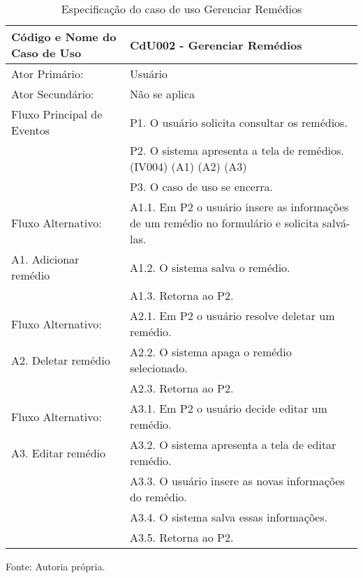 \begin{apendicesenv}
\begin{table}[!h]
	\begin{center}
		\caption{Especificação do caso de uso Gerenciar Remédios}
		\begin{tabular}{ | l |  p{10cm} |}
			\hline
			Código e Nome do Caso de Uso & CdU002 - Gerenciar Remédios \\ \hline
			Ator Primário: & Usuário \\
			Ator Secundário: & Não se aplica \\ \hline
			Fluxo Principal de Eventos & P1. O usuário solicita consultar os remédios. \\
						   & P2. O sistema apresenta a tela de remédios. (IV004) (A1) (A2) (A3) \\
						   & P3. O caso de uso se encerra. \\ \hline
			Fluxo Alternativo:         & A1.1. Em P2 o usuário insere as informações de um remédio no formulário e solicita salvá-las. \\
			A1. Adicionar remédio      & A1.2. O sistema salva o remédio. \\
						   & A1.3. Retorna ao P2. \\ \hline
			Fluxo Alternativo:         & A2.1. Em P2 o usuário resolve deletar um remédio. \\
			A2. Deletar remédio        & A2.2. O sistema apaga o remédio selecionado. \\
						   & A2.3. Retorna ao P2. \\ \hline
			Fluxo Alternativo:         & A3.1. Em P2 o usuário decide editar um remédio. \\
			A3. Editar remédio         & A3.2. O sistema apresenta a tela de editar remédio. \\
						   & A3.3. O usuário insere as novas informações do remédio. \\
						   & A3.4. O sistema salva essas informações. \\
						   & A3.5. Retorna ao P2. \\
			\hline
		\end{tabular}
		Fonte: Autoria própria.
	\end{center}
\end{table}


\end{apendicesenv}
